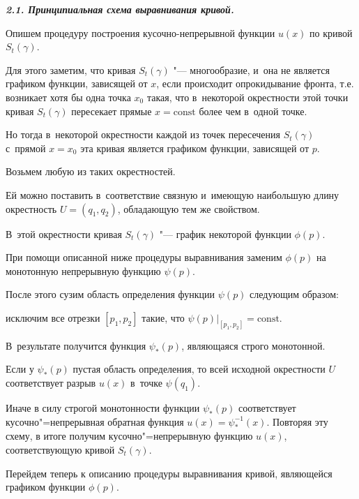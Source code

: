 \smallskip



{\bf \itshape 2.1. Принципиальная схема выравнивания кривой.}

Опишем процедуру построения кусочно-непрерывной функции $u(x)$ по кривой $S_t(\gamma)$. 

Для этого заметим, что кривая $S_t(\gamma)$ "--- многообразие, и~она не является графиком функции, зависящей от $x$, если происходит опрокидывание фронта, т.е. возникает хотя бы одна точка $x_0$ такая, что в~некоторой окрестности этой точки кривая $S_t(\gamma)$ пересекает прямые $x=\mbox{const}$ более чем в~одной точке. 

Но тогда в~некоторой окрестности каждой из точек пересечения $S_t(\gamma)$ с~прямой $x=x_0$ эта кривая является графиком функции, зависящей от $p$. 

Возьмем любую из таких окрестностей. 

Ей можно поставить в~соответствие связную и~имеющую наибольшую длину окрестность $U=(q_1,q_2)$, обладающую тем же свойством. 

В~этой окрестности кривая $S_t(\gamma)$ "--- график некоторой функции $\phi(p)$. 

При помощи описанной ниже процедуры выравнивания заменим $\phi(p)$ на монотонную непрерывную функцию $\psi(p)$. 

После этого сузим область определения функции $\psi(p)$ следующим образом: 

исключим все отрезки $[p_1,p_2]$ такие, что $\psi(p)\bigr|_{[p_1,p_2]}=\mbox{const}$. 

В~результате получится функция $\psi_*(p)$, являющаяся строго монотонной. 

Если у $\psi_*(p)$ пустая область определения, то всей исходной окрестности $U$ соответствует разрыв $u(x)$ в~точке $\psi(q_1)$. 

Иначе в силу строгой монотонности функции $\psi_*(p)$ соответствует кусочно"=непрерывная обратная функция $u(x)=\psi_*^{-1}(x)$. Повторяя эту схему, в итоге получим кусочно"=непрерывную функцию $u(x)$, соответствующую кривой $S_t(\gamma)$.



Перейдем теперь к описанию процедуры выравнивания кривой, являющейся графиком функции $\phi(p)$.



\smallskip



\pagebreak



